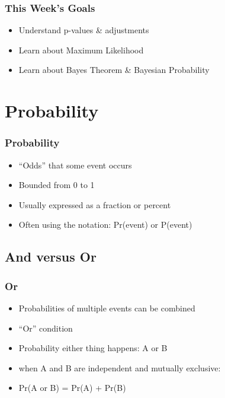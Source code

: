 \documentclass[14pt,handout]{beamer}
\begin{document}

\begin{frame}
\frametitle{This Week's Goals}
\begin{itemize}
	\item<+-> Understand p-values \& adjustments
	\item<+-> Learn about Maximum Likelihood
	\item<+-> Learn about Bayes Theorem \& Bayesian Probability
\end{itemize}
\end{frame}

\section{Probability}

\begin{frame}
\frametitle{Probability}
\begin{itemize}
	\item<+-> ``Odds'' that some event occurs
	\item<+-> Bounded from 0 to 1
	\item<+-> Usually expressed as a fraction or percent
	\item<+-> Often using the notation: Pr(event) or P(event)
\end{itemize}
\end{frame}

\subsection{And versus Or}

\begin{frame}
\frametitle{Or}
\begin{itemize}
	\item<+-> Probabilities of multiple events can be combined
	\item<+-> ``Or'' condition
	\item<+-> Probability either thing happens: A or B
	\item<+-> when A and B are independent and mutually exclusive:
	\item<+-> Pr(A or B) = Pr(A) + Pr(B)
\end{itemize}
\end{frame}
\end{document}
